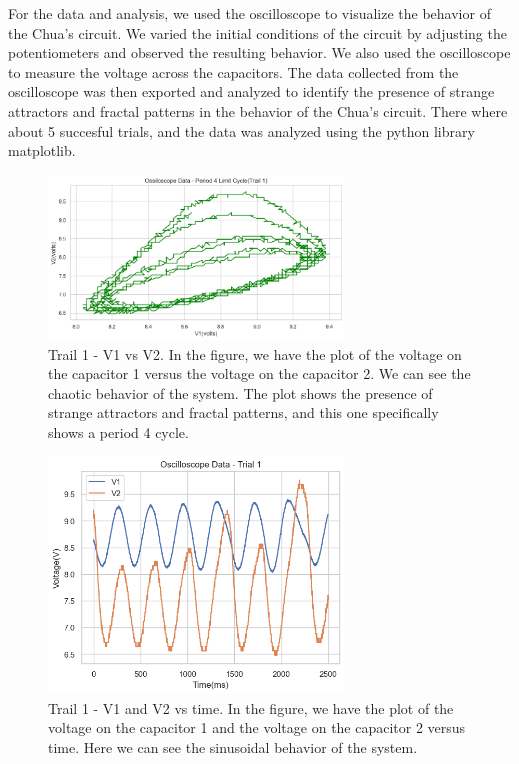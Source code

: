 \documentclass[12pt]{article}
\begin{document}
        For the data and analysis, we used the oscilloscope to visualize the behavior of the Chua's circuit. 
        We varied the initial conditions of the circuit by adjusting the potentiometers and observed the resulting behavior. 
        We also used the oscilloscope to measure the voltage across the capacitors. 
        The data collected from the oscilloscope was then exported and analyzed to identify the presence of strange attractors and fractal patterns 
        in the behavior of the Chua's circuit. There where about 5 succesful trials, and the data was analyzed using the python library matplotlib.

        \begin{figure}[!htb]
                \centering
                \includegraphics[width=0.7\textwidth]{./img/plots/Trail1_VonV.png}
                \caption{Trail 1 - V1 vs V2. In the figure, we have the plot of the voltage on the capacitor 1 versus the voltage on the capacitor 2. 
                We can see the chaotic behavior of the system. The plot shows the presence of strange attractors and fractal patterns, and this one specifically shows a period 4 cycle.}
                \label{fig: Trail 1 - V on V.}
        \end{figure} \pagebreak
        \begin{figure}[!htb]
                \centering
                \includegraphics[width=0.7\textwidth]{./img/plots/Trail1_O.png}
                \caption{Trail 1 - V1 and V2 vs time. In the figure, we have the plot of the voltage on the capacitor 1 and the voltage on the capacitor 2 versus time. 
                Here we can see the sinusoidal behavior of the system. }
        \end{figure}
\end{document}
